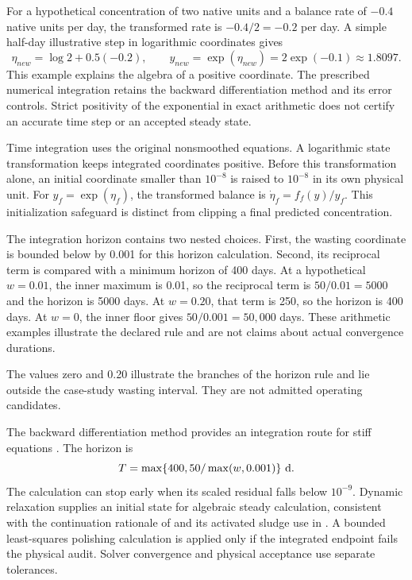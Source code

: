 For a hypothetical concentration of two native units and a balance rate of $-0.4$ native units per day, the transformed rate is $-0.4/2=-0.2$ per day. A simple half-day illustrative step in logarithmic coordinates gives
\[
\eta_{new}=\log2+0.5(-0.2),\qquad
y_{new}=\exp(\eta_{new})=2\exp(-0.1)\approx1.8097.
\]
This example explains the algebra of a positive coordinate. The prescribed numerical integration retains the backward differentiation method and its error controls. Strict positivity of the exponential in exact arithmetic does not certify an accurate time step or an accepted steady state.

Time integration uses the original nonsmoothed equations. A logarithmic state transformation keeps integrated coordinates positive. Before this transformation alone, an initial coordinate smaller than $10^{-8}$ is raised to $10^{-8}$ in its own physical unit. For $y_f=\exp(\eta_f)$, the transformed balance is $\dot\eta_f=f_f(y)/y_f$. This initialization safeguard is distinct from clipping a final predicted concentration.

The integration horizon contains two nested choices. First, the wasting coordinate is bounded below by 0.001 for this horizon calculation. Second, its reciprocal term is compared with a minimum horizon of 400 days. At a hypothetical $w=0.01$, the inner maximum is 0.01, so the reciprocal term is $50/0.01=5000$ and the horizon is 5000 days. At $w=0.20$, that term is 250, so the horizon is 400 days. At $w=0$, the inner floor gives $50/0.001=50{,}000$ days. These arithmetic examples illustrate the declared rule and are not claims about actual convergence durations.

The values zero and 0.20 illustrate the branches of the horizon rule and lie outside the case-study wasting interval. They are not admitted operating candidates.

The backward differentiation method provides an integration route for stiff equations \citep{CurtissHirschfelder1952}. The horizon is
\begin{equation}
\equationname{Waste-dependent horizon for dynamic relaxation}
T=\max\{400,50/\max(w,0.001)\}\ \mathrm{d}.
\label{eq:plant_integration_horizon}
\end{equation}
The calculation can stop early when its scaled residual falls below $10^{-9}$. Dynamic relaxation supplies an initial state for algebraic steady calculation, consistent with the continuation rationale of \citet{KelleyKeyes1998} and its activated sludge use in \citet{Selerio2026}. A bounded least-squares polishing calculation is applied only if the integrated endpoint fails the physical audit. Solver convergence and physical acceptance use separate tolerances.

